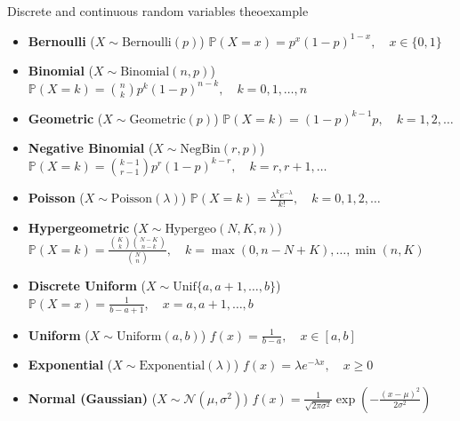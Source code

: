 \documentclass{tufte-handout}
\begin{document}
\begin{mybox}{Discrete and continuous random variables }{theoexample}
\small


\begin{itemize}
    \item \textbf{Bernoulli} ($X \sim \text{Bernoulli}(p)$)  
    $\mathbb{P}(X = x) = p^x (1 - p)^{1 - x}, \quad x \in \{0,1\}$

    \item \textbf{Binomial} ($X \sim \text{Binomial}(n, p)$)  
    $\mathbb{P}(X = k) = \binom{n}{k} p^k (1 - p)^{n - k}, \quad k = 0,1,\dots,n$

    \item \textbf{Geometric} ($X \sim \text{Geometric}(p)$)  
    $\mathbb{P}(X = k) = (1 - p)^{k - 1} p, \quad k = 1,2,\dots$

    \item \textbf{Negative Binomial} ($X \sim \text{NegBin}(r, p)$)  
    $\mathbb{P}(X = k) = \binom{k - 1}{r - 1} p^r (1 - p)^{k - r}, \quad k = r, r+1,\dots$

    \item \textbf{Poisson} ($X \sim \text{Poisson}(\lambda)$)  
    $\mathbb{P}(X = k) = \frac{\lambda^k e^{-\lambda}}{k!}, \quad k = 0,1,2,\dots$

    \item \textbf{Hypergeometric} ($X \sim \text{Hypergeo}(N, K, n)$)  
    $\mathbb{P}(X = k) = \frac{\binom{K}{k} \binom{N - K}{n - k}}{\binom{N}{n}}, \quad k = \max(0, n - N + K), \dots, \min(n, K)$

    \item \textbf{Discrete Uniform} ($X \sim \text{Unif}\{a, a+1, \dots, b\}$)  
    $\mathbb{P}(X = x) = \frac{1}{b - a + 1}, \quad x = a, a+1, \dots, b$
\end{itemize}

\begin{itemize}
    \item \textbf{Uniform} ($X \sim \text{Uniform}(a, b)$)  
    $f(x) = \frac{1}{b - a}, \quad x \in [a, b]$

    \item \textbf{Exponential} ($X \sim \text{Exponential}(\lambda)$)  
    $f(x) = \lambda e^{-\lambda x}, \quad x \geq 0$

    \item \textbf{Normal (Gaussian)} ($X \sim \mathcal{N}(\mu, \sigma^2)$)  
    $f(x) = \frac{1}{\sqrt{2\pi \sigma^2}} \exp\left( -\frac{(x - \mu)^2}{2\sigma^2} \right)$


\end{itemize}
\end{mybox}
\end{document}
